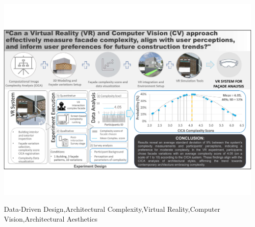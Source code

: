 \documentclass[final,5p,times]{elsarticle}%
\begin{document}
\begin{frontmatter}
\begin{abstract}
\end{abstract}



\begin{graphicalabstract}
    \centering
    \includegraphics[width= \textwidth, trim = 0 80 0 80, clip]{Images/GraphicAbstract}
    \label{fig:graphic_abstract}
\end{graphicalabstract}

\begin{highlights}

\end{highlights}

\begin{keyword}
Data-Driven Design\sep Architectural Complexity\sep Virtual Reality\sep Computer Vision\sep Architectural Aesthetics
\end{keyword}

\end{frontmatter}
%







\appendix

\end{document}
